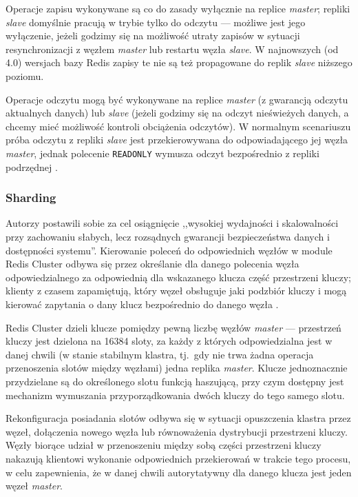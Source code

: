 Operacje zapisu wykonywane są co do zasady wyłącznie na replice \textit{master}; repliki \textit{slave} domyślnie pracują w trybie tylko do odczytu --- możliwe jest jego wyłączenie, jeżeli godzimy się na możliwość utraty zapisów w sytuacji resynchronizacji z węzłem \textit{master} lub restartu węzła \textit{slave}. W najnowszych (od 4.0) wersjach bazy Redis zapisy te nie są też propagowane do replik \textit{slave} niższego poziomu.

Operacje odczytu mogą być wykonywane na replice \textit{master} (z gwarancją odczytu aktualnych danych) lub \textit{slave} (jeżeli godzimy się na odczyt nieświeżych danych, a chcemy mieć możliwość kontroli obciążenia odczytów). W normalnym scenariuszu próba odczytu z repliki \textit{slave} jest przekierowywana do odpowiadającego jej węzła \textit{master}, jednak polecenie \texttt{READONLY} wymusza odczyt bezpośrednio z repliki podrzędnej \cite{rediscluster}.


\subsubsection*{Sharding}

Autorzy postawili sobie za cel osiągnięcie ,,wysokiej wydajności i skalowalności przy zachowaniu słabych, lecz rozsądnych gwarancji bezpieczeństwa danych i dostępności systemu''. Kierowanie poleceń do odpowiednich węzłów w module Redis Cluster odbywa się przez określanie dla danego polecenia węzła odpowiedzialnego za odpowiednią dla wskazanego klucza część przestrzeni kluczy; klienty z czasem zapamiętują, który węzeł obsługuje jaki podzbiór kluczy i mogą kierować zapytania o dany klucz bezpośrednio do danego węzła \cite{rediscluster}.

Redis Cluster dzieli klucze pomiędzy pewną liczbę węzłów \textit{master} --- przestrzeń kluczy jest
dzielona na 16384 sloty, za każdy z których odpowiedzialna jest w danej chwili (w stanie stabilnym
klastra, tj.\ gdy nie trwa żadna operacja przenoszenia slotów między węzłami) jedna replika \textit{master}. Klucze jednoznacznie przydzielane są do określonego slotu funkcją haszującą, przy czym dostępny jest mechanizm wymuszania przyporządkowania dwóch kluczy do tego samego slotu.

Rekonfiguracja posiadania slotów odbywa się w sytuacji opuszczenia klastra przez węzeł, dołączenia nowego węzła lub równoważenia dystrybucji przestrzeni kluczy. Węzły biorące udział w przenoszeniu między sobą części przestrzeni kluczy nakazują klientowi wykonanie odpowiednich przekierowań w trakcie tego procesu, w celu zapewnienia, że w danej chwili autorytatywny dla danego klucza jest jeden węzeł \textit{master}.

